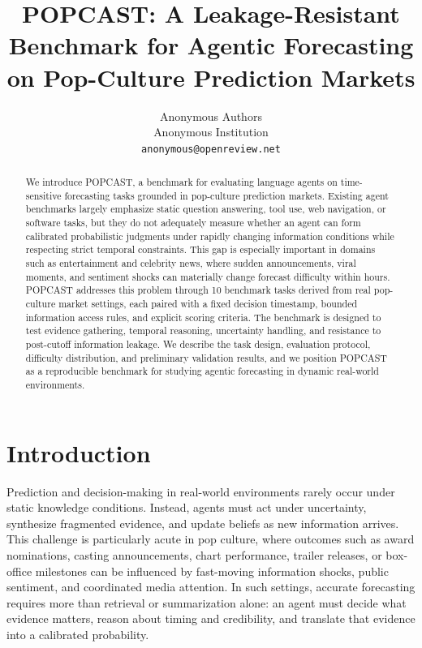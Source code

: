 \documentclass{article} %
\title{POPCAST: A Leakage-Resistant Benchmark for Agentic Forecasting on Pop-Culture Prediction Markets}
\author{Anonymous Authors \\
Anonymous Institution \\
\texttt{anonymous@openreview.net}
}
\newcommand{\benchmarkname}{POPCAST}
\begin{document}
\maketitle

\begin{abstract}
We introduce \benchmarkname{}, a benchmark for evaluating language agents on time-sensitive forecasting tasks grounded in pop-culture prediction markets. Existing agent benchmarks largely emphasize static question answering, tool use, web navigation, or software tasks, but they do not adequately measure whether an agent can form calibrated probabilistic judgments under rapidly changing information conditions while respecting strict temporal constraints. This gap is especially important in domains such as entertainment and celebrity news, where sudden announcements, viral moments, and sentiment shocks can materially change forecast difficulty within hours. \benchmarkname{} addresses this problem through 10 benchmark tasks derived from real pop-culture market settings, each paired with a fixed decision timestamp, bounded information access rules, and explicit scoring criteria. The benchmark is designed to test evidence gathering, temporal reasoning, uncertainty handling, and resistance to post-cutoff information leakage. We describe the task design, evaluation protocol, difficulty distribution, and preliminary validation results, and we position \benchmarkname{} as a reproducible benchmark for studying agentic forecasting in dynamic real-world environments.
\end{abstract}

\section{Introduction}

Prediction and decision-making in real-world environments rarely occur under static knowledge conditions. Instead, agents must act under uncertainty, synthesize fragmented evidence, and update beliefs as new information arrives. This challenge is particularly acute in pop culture, where outcomes such as award nominations, casting announcements, chart performance, trailer releases, or box-office milestones can be influenced by fast-moving information shocks, public sentiment, and coordinated media attention. In such settings, accurate forecasting requires more than retrieval or summarization alone: an agent must decide what evidence matters, reason about timing and credibility, and translate that evidence into a calibrated probability.
\end{document}
